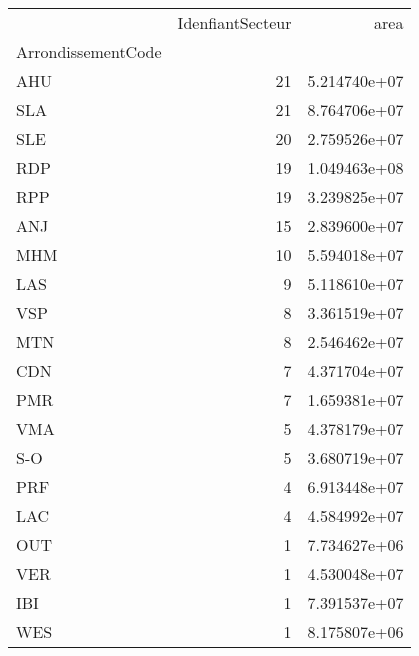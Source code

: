 \begin{tabular}{lrr}
\toprule
{} &  IdenfiantSecteur &          area \\
ArrondissementCode &                   &               \\
\midrule
AHU                &                21 &  5.214740e+07 \\
SLA                &                21 &  8.764706e+07 \\
SLE                &                20 &  2.759526e+07 \\
RDP                &                19 &  1.049463e+08 \\
RPP                &                19 &  3.239825e+07 \\
ANJ                &                15 &  2.839600e+07 \\
MHM                &                10 &  5.594018e+07 \\
LAS                &                 9 &  5.118610e+07 \\
VSP                &                 8 &  3.361519e+07 \\
MTN                &                 8 &  2.546462e+07 \\
CDN                &                 7 &  4.371704e+07 \\
PMR                &                 7 &  1.659381e+07 \\
VMA                &                 5 &  4.378179e+07 \\
S-O                &                 5 &  3.680719e+07 \\
PRF                &                 4 &  6.913448e+07 \\
LAC                &                 4 &  4.584992e+07 \\
OUT                &                 1 &  7.734627e+06 \\
VER                &                 1 &  4.530048e+07 \\
IBI                &                 1 &  7.391537e+07 \\
WES                &                 1 &  8.175807e+06 \\
\bottomrule
\end{tabular}
